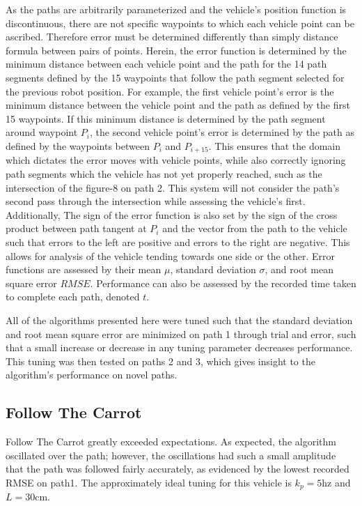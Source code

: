 \documentclass[12pt]{article}
\begin{document}
\begin{flushleft}
As the paths are arbitrarily parameterized and the vehicle's position function is discontinuous, there are not specific waypoints to which each vehicle point can be ascribed. Therefore error must be determined differently than simply distance formula between pairs of points. Herein, the error function is determined by the minimum distance between each vehicle point and the path for the 14 path segments defined by the 15 waypoints that follow the path segment selected for the previous robot position. For example, the first vehicle point's error is the minimum distance between the vehicle point and the path as defined by the first 15 waypoints. If this minimum distance is determined by the path segment around waypoint $P_i$, the second vehicle point's error is determined by the path as defined by the waypoints between $P_i$ and $P_{i+15}$. This ensures that the domain which dictates the error moves with vehicle points, while also correctly ignoring path segments which the vehicle has not yet properly reached, such as the intersection of the figure-8 on path 2. This system will not consider the path's second pass through the intersection while assessing the vehicle's first. Additionally, The sign of the error function is also set by the sign of the cross product between path tangent at $P_i$ and the vector from the path to the vehicle such that errors to the left are positive and errors to the right are negative. This allows for analysis of the vehicle tending towards one side or the other. Error functions are assessed by their mean $\mu$, standard deviation $\sigma$, and root mean square error $RMSE$. Performance can also be assessed by the recorded time taken to complete each path, denoted $t$.

All of the algorithms presented here were tuned such that the standard deviation and root mean square error are minimized on path 1 through trial and error, such that a small increase or decrease in any tuning parameter decreases performance. This tuning was then tested on paths 2 and 3, which gives insight to the algorithm's performance on novel paths.

\newpage

\subsection{Follow The Carrot}

Follow The Carrot greatly exceeded expectations. As expected, the algorithm oscillated over the path; however, the oscillations had such a small amplitude that the path was followed fairly accurately, as evidenced by the lowest recorded RMSE on path1. The approximately ideal tuning for this vehicle is $k_p=5$hz and $L=30$cm.


\end{flushleft}
\end{document}
